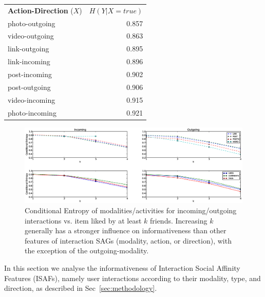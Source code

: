 \begin{table}
{\begin{tabular}{| >{\small}l | >{\small}r | }
		\hline
\multicolumn{2}{c}{}\\
                \hline	
		\textbf{Action-Direction} ($X$) & $H(Y|X=true)$ \\
		\hline
		photo-outgoing & 0.857 \\
		video-outgoing & 0.863 \\
		link-outgoing & 0.895 \\
		link-incoming & 0.896 \\
		post-incoming & 0.902 \\
		post-outgoing & 0.906 \\
		video-incoming & 0.915 \\
		photo-incoming & 0.921 \\
		\hline
				
	\end{tabular}}
\end{table}

\begin{figure}[tbp!]
\hspace{-15mm}\includegraphics[width=210mm]{data/plots/vsk/ModalityActionsvsKFriends.eps}
\caption{Conditional Entropy  of modalities/activities for incoming/outgoing interactions vs. item liked by at least $k$ friends.  Increasing $k$ generally has a stronger influence on informativeness
than other features of interaction SAGs (modality, action, or direction), with the
exception of the outgoing-modality.}
\label{Fig2}
\end{figure}

In this section we analyse the informativeness of Interaction Social
Affinity Features (ISAFs), namely user interactions according to their
modality, type, and direction, as described in
Sec~\ref{sec:methodology}.

